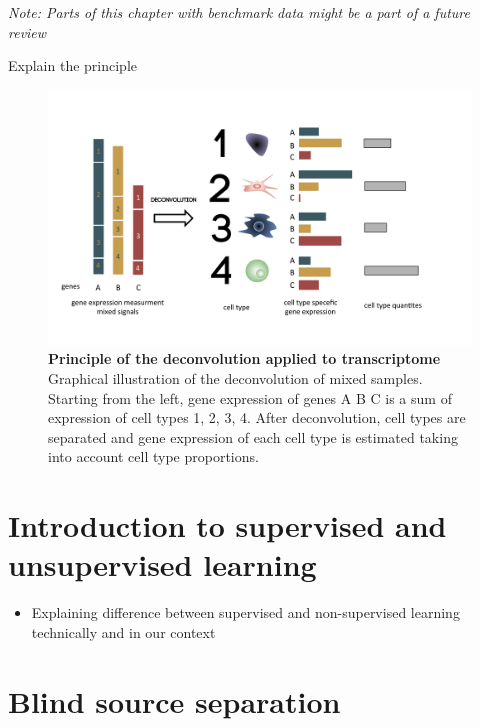 \documentclass[12pt,]{book}
\providecommand{\tightlist}{%
  \setlength{\itemsep}{0pt}\setlength{\parskip}{0pt}}
\theoremstyle{definition}
\theoremstyle{definition}
\theoremstyle{definition}
\theoremstyle{remark}
\begin{document}
\emph{Note: Parts of this chapter with benchmark data might be a part of
a future review}

Explain the principle

\begin{figure}

{\centering \includegraphics[width=1\linewidth]{figures-ext/deconv} 

}

\caption{\textbf{Principle of the
deconvolution applied to transcriptome} Graphical illustration of the
deconvolution of mixed samples. Starting from the left, gene expression
of genes A B C is a sum of expression of cell types 1, 2, 3, 4. After
deconvolution, cell types are separated and gene expression of each cell
type is estimated taking into account cell type proportions.}\label{fig:deconvolution-cartoon}
\end{figure}








\hypertarget{introduction-to-supervised-and-unsupervised-learning}{%
\section{Introduction to supervised and unsupervised
learning}\label{introduction-to-supervised-and-unsupervised-learning}}

\begin{itemize}
\tightlist
\item
  Explaining difference between supervised and non-supervised learning
  technically and in our context
\end{itemize}

\hypertarget{blind-source-separation}{%
\section{Blind source separation}\label{blind-source-separation}}
\end{document}
